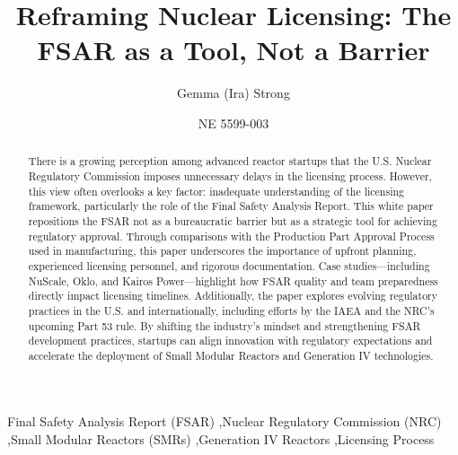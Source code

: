 \documentclass[5p,authoryear]{elsarticle}
\begin{document}
\begin{frontmatter}

\title{Reframing Nuclear Licensing: The FSAR as a Tool, Not a Barrier}

\author{Gemma (Ira) Strong}
\address{Idaho State University\\ Nuclear Engineering Department }

\author{NE 5599-003 }
\address{Professor Dr. Richard Schultz}
\address{May 4th, 2025}

\begin{abstract}
There is a growing perception among advanced reactor startups that the U.S. Nuclear Regulatory Commission imposes unnecessary delays in the licensing process. However, this view often overlooks a key factor: inadequate understanding of the licensing framework, particularly the role of the Final Safety Analysis Report. This white paper repositions the FSAR not as a bureaucratic barrier but as a strategic tool for achieving regulatory approval. Through comparisons with the Production Part Approval Process used in manufacturing, this paper underscores the importance of upfront planning, experienced licensing personnel, and rigorous documentation. Case studies—including NuScale, Oklo, and Kairos Power—highlight how FSAR quality and team preparedness directly impact licensing timelines. Additionally, the paper explores evolving regulatory practices in the U.S. and internationally, including efforts by the IAEA and the NRC’s upcoming Part 53 rule. By shifting the industry’s mindset and strengthening FSAR development practices, startups can align innovation with regulatory expectations and accelerate the deployment of Small Modular Reactors and Generation IV technologies.
\end{abstract}

\begin{keyword}
Final Safety Analysis Report (FSAR) \sep Nuclear Regulatory Commission (NRC) \sep Small Modular Reactors (SMRs) \sep Generation IV Reactors \sep Licensing Process\end{keyword}

\end{frontmatter}

\end{document}
